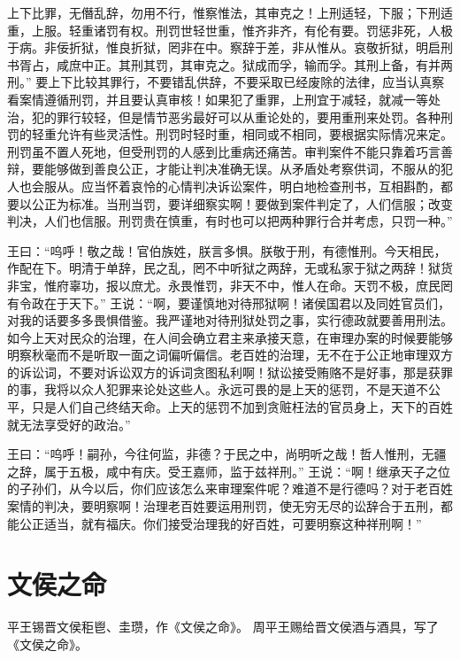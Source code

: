 \documentclass[12pt,UTF8]{ctexbook}
\begin{document}
上下比罪，无僭乱辞，勿用不行，惟察惟法，其审克之！上刑适轻，下服；下刑适重，上服。轻重诸罚有权。刑罚世轻世重，惟齐非齐，有伦有要。罚惩非死，人极于病。非佞折狱，惟良折狱，罔非在中。察辞于差，非从惟从。哀敬折狱，明启刑书胥占，咸庶中正。其刑其罚，其审克之。狱成而孚，输而孚。其刑上备，有并两刑。”
要上下比较其罪行，不要错乱供辞，不要采取已经废除的法律，应当认真察看案情遵循刑罚，并且要认真审核！如果犯了重罪，上刑宜于减轻，就减一等处治，犯的罪行较轻，但是情节恶劣最好可以从重论处的，要用重刑来处罚。各种刑罚的轻重允许有些灵活性。刑罚时轻时重，相同或不相同，要根据实际情况来定。刑罚虽不置人死地，但受刑罚的人感到比重病还痛苦。审判案件不能只靠着巧言善辩，要能够做到善良公正，才能让判决准确无误。从矛盾处考察供词，不服从的犯人也会服从。应当怀着哀怜的心情判决诉讼案件，明白地检查刑书，互相斟酌，都要以公正为标准。当刑当罚，要详细察实啊！要做到案件判定了，人们信服；改变判决，人们也信服。刑罚贵在慎重，有时也可以把两种罪行合并考虑，只罚一种。”

王曰：“呜呼！敬之哉！官伯族姓，朕言多惧。朕敬于刑，有德惟刑。今天相民，作配在下。明清于单辞，民之乱，罔不中听狱之两辞，无或私家于狱之两辞！狱货非宝，惟府辜功，报以庶尤。永畏惟罚，非天不中，惟人在命。天罚不极，庶民罔有令政在于天下。”
王说：“啊，要谨慎地对待邢狱啊！诸侯国君以及同姓官员们，对我的话要多多畏惧借鉴。我严谨地对待刑狱处罚之事，实行德政就要善用刑法。如今上天对民众的治理，在人间会确立君主来承接天意，在审理办案的时候要能够明察秋毫而不是听取一面之词偏听偏信。老百姓的治理，无不在于公正地审理双方的诉讼词，不要对诉讼双方的诉词贪图私利啊！狱讼接受贿赂不是好事，那是获罪的事，我将以众人犯罪来论处这些人。永远可畏的是上天的惩罚，不是天道不公平，只是人们自己终结天命。上天的惩罚不加到贪赃枉法的官员身上，天下的百姓就无法享受好的政治。”

王曰：“呜呼！嗣孙，今往何监，非德？于民之中，尚明听之哉！哲人惟刑，无疆之辞，属于五极，咸中有庆。受王嘉师，监于兹祥刑。”
王说：“啊！继承天子之位的子孙们，从今以后，你们应该怎么来审理案件呢？难道不是行德吗？对于老百姓案情的判决，要明察啊！治理老百姓要运用刑罚，使无穷无尽的讼辞合于五刑，都能公正适当，就有福庆。你们接受治理我的好百姓，可要明察这种祥刑啊！”

\chapter{文侯之命}

平王锡晋文侯秬鬯、圭瓒，作《文侯之命》。
周平王赐给晋文侯酒与酒具，写了《文侯之命》。
\end{document}
